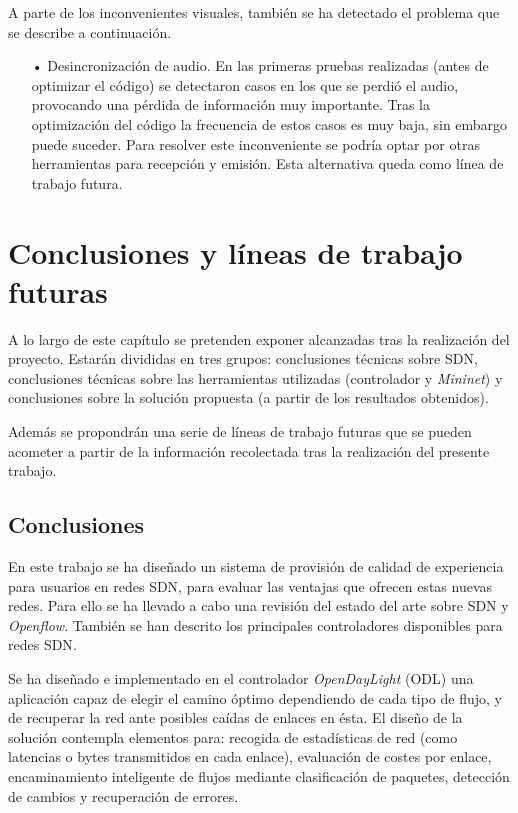 \documentclass[a4paper,11pt]{book}
\begin{document}
A parte de los inconvenientes visuales, también se ha detectado el problema que se describe a continuación.

\begin{itemize}
\item[•] Desincronización de audio. En las primeras pruebas realizadas (antes de optimizar el código) se detectaron casos en los que se perdió el audio, provocando una pérdida de información muy importante. Tras la optimización del código la frecuencia de estos casos es muy baja, sin embargo puede suceder. Para resolver este inconveniente se podría optar por otras herramientas para recepción y emisión. Esta alternativa queda como línea de trabajo futura.
\end{itemize}

\chapter{Conclusiones y líneas de trabajo futuras}\label{chap:conclusiones}
A lo largo de este capítulo se pretenden exponer alcanzadas tras la realización del proyecto. Estarán divididas en tres grupos: conclusiones técnicas sobre \ac{SDN}, conclusiones técnicas sobre las herramientas utilizadas (controlador y \emph{Mininet}) y conclusiones sobre la solución propuesta (a partir de los resultados obtenidos).

Además se propondrán una serie de líneas de trabajo futuras que se pueden acometer a partir de la información recolectada tras la realización del presente trabajo.

\section{Conclusiones}

En este trabajo se ha diseñado un sistema de provisión de calidad de experiencia para usuarios en redes \ac{SDN}, para evaluar las ventajas que ofrecen estas nuevas redes. Para ello se ha llevado a cabo una revisión del estado del arte sobre \ac{SDN} y \emph{Openflow}. También se han descrito los principales controladores disponibles para redes \ac{SDN}.

Se ha diseñado e implementado en el controlador \emph {OpenDayLight} (ODL) una aplicación capaz de elegir el camino óptimo dependiendo de cada tipo de flujo, y de recuperar la red ante posibles caídas de enlaces en ésta. El diseño de la solución contempla elementos para: recogida de estadísticas de red (como latencias o bytes transmitidos en cada enlace), evaluación de costes por enlace, encaminamiento inteligente de flujos mediante clasificación de paquetes, detección de cambios y recuperación de errores.
\end{document}
